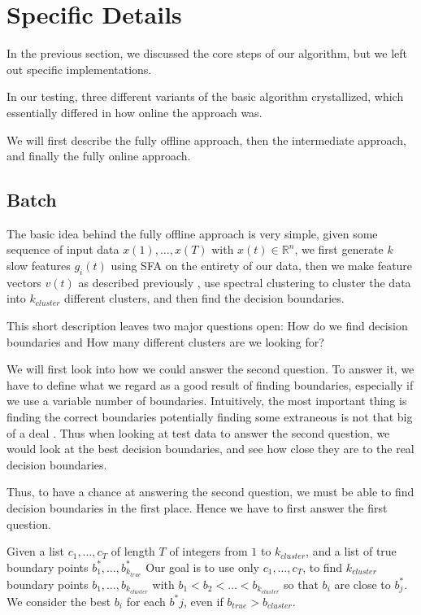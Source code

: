 \section{Specific Details}
In the previous section, we discussed the core steps of our algorithm, but we left out specific implementations. 

In our testing, three different variants of the basic algorithm crystallized, which essentially differed in how online the approach was.

We will first describe the fully offline approach, then the intermediate approach, and finally the fully online approach.
\subsection{Batch}
The basic idea behind the fully offline approach is very simple, given some sequence of input data $x(1), \ldots, x(T)$ with $x(t) \in \mathbb{R}^n$, we first generate $k$ slow features $g_i(t)$ using SFA on the entirety of our data, then we make feature vectors $v(t)$ as described previously , use spectral clustering to cluster the data into $k_{cluster}$ different clusters, and then find the decision boundaries.

This short description leaves two major questions open: How do we find decision boundaries and How many different clusters are we looking for?

We will first look into how we could answer the second question. To answer it, we have to define what we regard as a good result of finding boundaries, especially if we use a variable number of boundaries. Intuitively, the most important thing is finding the correct boundaries potentially finding some extraneous  is not that big of a deal . Thus when looking at test data to answer the second question, we would look at the best decision boundaries, and see how close they are to the real decision boundaries.

Thus, to have a chance at answering the second question, we must be able to find decision boundaries in the first place. Hence we have to first answer the first question.

Given a list $c_1,\ldots,c_{T}$ of length $T$  of integers from $1$ to $k_{cluster}$, and a list of true boundary points $b^*_1,\ldots, b^*_{k_{true}}$ Our goal is to use only $c_1,\ldots, c_{T}$, to find $k_{cluster}$ boundary points $b_1,\ldots,b_{k_{cluster}}$ with $b_1 < b_2 < \ldots <b_{k_{cluster}}$ so that $b_i$ are close to $b^*_j$. We consider the best $b_i$ for each $b^*{j}$, even if $b_{true}>b_{cluster}$. 

